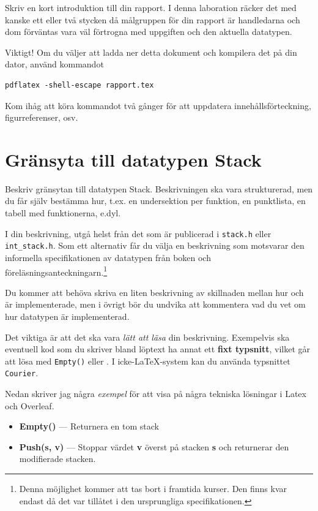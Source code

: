 \documentclass[10pt, titlepage, oneside, a4paper]{article}
\begin{document}
Skriv en kort introduktion till din rapport. I denna laboration räcker
det med kanske ett eller två stycken då målgruppen för din rapport är
handledarna och dom förväntas vara väl förtrogna med uppgiften och den
aktuella datatypen.

Viktigt! Om du väljer att ladda ner detta dokument och kompilera det
på din dator, använd kommandot
\begin{verbatim}
pdflatex -shell-escape rapport.tex
\end{verbatim}
Kom ihåg att köra kommandot två gånger för att uppdatera
innehållsförteckning, figurreferenser, osv.

\section{Gränsyta till datatypen Stack}

Beskriv gränsytan till datatypen Stack. Beskrivningen ska vara
strukturerad, men du får själv bestämma hur, t.ex. en undersektion per
funktion, en punktlista, en tabell med funktionerna, e.dyl.

I din beskrivning, utgå helst från det som är publicerad i
\texttt{stack.h} eller \texttt{int\_stack.h}. Som ett alternativ får
du välja en beskrivning som motsvarar den informella specifikationen
av datatypen från boken och föreläsningsanteckningarn.\footnote{Denna
möjlighet kommer att tas bort i framtida kurser. Den finns kvar endast
då det var tillåtet i den ursprungliga specifikationen.}

Du kommer att behöva skriva en liten beskrivning av skillnaden mellan
hur  och  är implementerade, men i
övrigt bör du undvika att kommentera vad du vet om hur datatypen är
implementerad.

Det viktiga är att det ska vara \textit{lätt att läsa} din
beskrivning. Exempelvis ska eventuell kod som du skriver bland löptext
ha annat ett \textbf{fixt typsnitt}, vilket går att lösa med
\texttt{Empty()} eller . I icke-\LaTeX-system kan du
använda typsnittet \texttt{Courier}.

Nedan skriver jag några \textit{exempel} för att visa på några tekniska
lösningar i Latex och Overleaf.

\begin{itemize}
\item \textbf{Empty()} --- Returnera en tom stack
\item \textbf{Push(s, v)} --- Stoppar värdet \textbf{v} överst på
  stacken \textbf{s} och returnerar den modifierade stacken.
\end{itemize}
\end{document}
